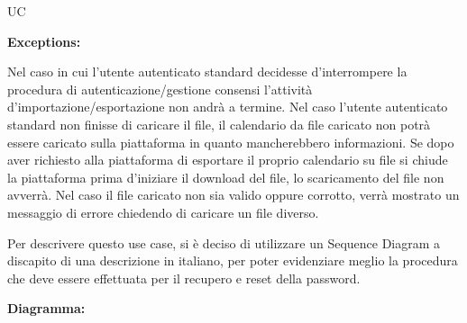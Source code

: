 \begin{listaPersonale}{UC}
\begin{listaPersonale2}[UC] {}
        \textbf{Exceptions:}
        \begin{enumerate}[label=\textbf{[exception \arabic{enumiii}]}, ref= \textbf{[exception \arabic{enumiii}]}]
             Nel caso in cui l'utente autenticato standard decidesse d'interrompere la procedura di autenticazione/gestione consensi l'attività d'importazione/esportazione non andrà a termine.
             Nel caso l'utente autenticato standard non finisse di caricare il file, il calendario da file caricato non potrà essere caricato sulla piattaforma in quanto mancherebbero informazioni.
             Se dopo aver richiesto alla piattaforma di esportare il proprio calendario su file si chiude la piattaforma prima d'iniziare il download del file, lo scaricamento del file non avverrà.
             Nel caso il file caricato non sia valido oppure corrotto, verrà mostrato un messaggio di errore chiedendo di caricare un file diverso.
        \end{enumerate}


    \end{listaPersonale2}


    \newpage

    \begin{center}
        
    \end{center}
    Per descrivere questo use case, si è deciso di utilizzare un Sequence Diagram a discapito di una descrizione in italiano, per poter evidenziare meglio la procedura che deve essere effettuata per il recupero e reset della password.

    \textbf{Diagramma:}
    \begin{center}
        
    \end{center}

\end{listaPersonale}